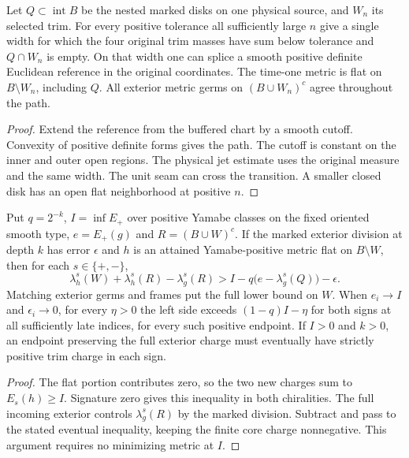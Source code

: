 \begin{theorem}
\label{thm:ed03-realized-disk-reference}
\leanok
Let $Q\subset\operatorname{int} B$ be the nested marked disks on one physical
source, and $W_n$ its selected trim. For every positive tolerance all sufficiently
large $n$ give a single width for which the four original trim masses have
sum below tolerance and $Q\cap W_n$ is empty. On that width one can splice
a smooth positive definite Euclidean reference in the original coordinates.
The time-one metric is flat on $B\setminus W_n$, including $Q$. All exterior
metric germs on $(B\cup W_n)^c$ agree throughout the path.
\end{theorem}
\begin{proof}
\leanok
Extend the reference from the buffered chart by a smooth cutoff. Convexity of
positive definite forms gives the path. The cutoff is constant on the inner
and outer open regions. The physical jet estimate uses the original measure
and the same width. The unit seam can cross the transition. A smaller closed disk
has an open flat neighborhood at positive $n$.
\end{proof}

\begin{theorem}
\label{thm:ed03-mandatory-flat-cost}
\leanok
Put $q=2^{-k}$, $I=\inf E_+$ over positive Yamabe classes on the fixed
oriented smooth type, $e=E_+(g)$ and $R=(B\cup W)^c$.
If the marked exterior division at depth $k$ has error $\epsilon$ and $h$
is an attained Yamabe-positive metric flat on $B\setminus W$, then for
each $s\in\{+,-\}$,
\[
 \lambda_h^s(W)+\lambda_h^s(R)-\lambda_g^s(R)
 > I-q\bigl(e-\lambda_g^s(Q)\bigr)-\epsilon .
\]
Matching exterior germs and frames put the full lower bound on $W$.
When $e_i\to I$ and $\epsilon_i\to0$, for every $\eta>0$ the left side
exceeds $(1-q)I-\eta$ for both signs at all sufficiently late indices,
for every such positive endpoint. If $I>0$ and $k>0$, an endpoint preserving
the full exterior charge must eventually have strictly positive trim charge
in each sign.
\end{theorem}
\begin{proof}
\leanok
The flat portion contributes zero, so the two new charges sum to
$E_s(h)\ge I$. Signature zero gives this inequality in both chiralities.
The full incoming exterior controls $\lambda_g^s(R)$ by the marked division.
Subtract and pass to the stated eventual inequality, keeping the finite core
charge nonnegative. This argument requires no minimizing metric at $I$.
\end{proof}

